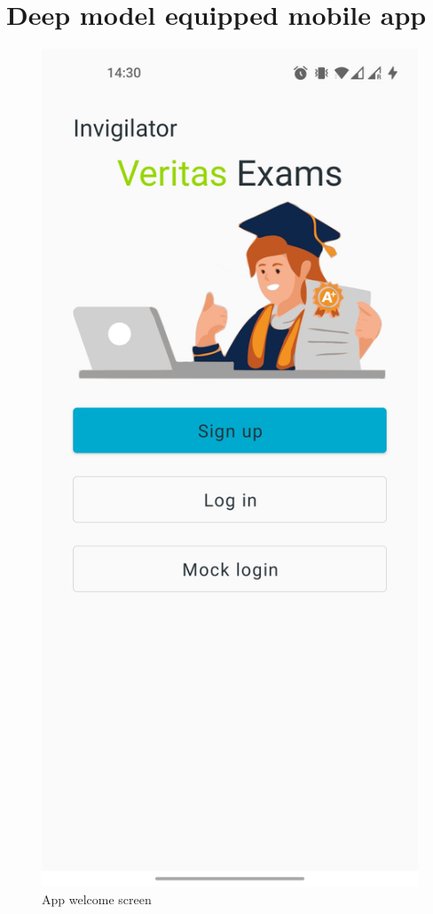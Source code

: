 \section{Deep model equipped mobile app}
\begin{minipage}{.5\textwidth}
\begin{figure}[H]
    \centering
    \includegraphics[width=\textwidth]{appendix/imgs/app-welcome.jpg}
    \caption{App welcome screen}
    \label{fig:app-welcome}
\end{figure}
\end{minipage}
